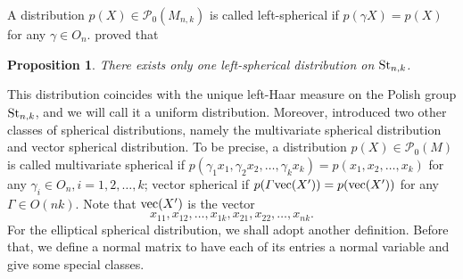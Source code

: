 \documentclass{amsart}
\newtheorem{proposition}[theorem]{Proposition}
\theoremstyle{definition}
\numberwithin{equation}{section}
\begin{document}
A distribution $p(X) \in \mathcal{P}_0 (M_{n,k})$ is called left-spherical if $p(\gamma X) = p(X)$ for any $\gamma \in O_n$. \cite{1990Generalized} proved that 
\begin{proposition}\label{prop: stiefel}
    There exists only one left-spherical distribution on ${\rm St}_{n,k}$.
\end{proposition}
This distribution coincides with the unique left-Haar measure on the Polish group ${\rm St}_{n,k}$, and we will call it a uniform distribution. Moreover, \cite{1990Generalized} introduced two other classes of spherical distributions, namely the multivariate spherical distribution and vector spherical distribution. To be precise, a distribution $p(X) \in \mathcal{P}_0 (M)$ is called multivariate spherical if $p(\gamma_1 x_1, \gamma_2 x_2, \dots, \gamma_k x_k) = p(x_1,x_2,\dots,x_k)$ for any $\gamma_i \in O_n, i = 1,2,\dots,k$; vector spherical if $p(\varGamma {\rm vec} (X')) = p({\rm vec} (X'))$ for any $\varGamma \in O(nk)$. Note that ${\rm vec} (X')$ is the vector $$x_{11},x_{12},\dots,x_{1k},x_{21},x_{22},\dots,x_{nk}.$$ 
For the elliptical spherical distribution, we shall adopt another definition. Before that, we define a normal matrix to have each of its entries a normal variable and give some special classes. 
\end{document}
